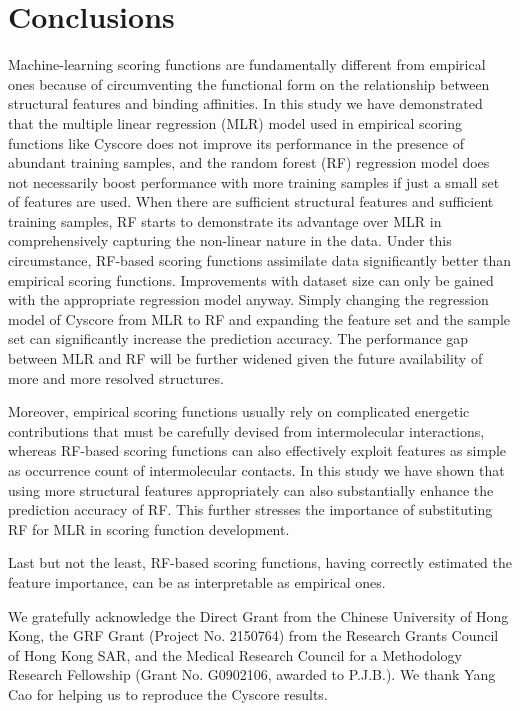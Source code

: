 \documentclass[journal=jacsat,manuscript=article]{achemso}
\begin{document}
\section{Conclusions}

Machine-learning scoring functions are fundamentally different from empirical ones because of circumventing the functional form on the relationship between structural features and binding affinities. In this study we have demonstrated that the multiple linear regression (MLR) model used in empirical scoring functions like Cyscore does not improve its performance in the presence of abundant training samples, and the random forest (RF) regression model does not necessarily boost performance with more training samples if just a small set of features are used. When there are sufficient structural features and sufficient training samples, RF starts to demonstrate its advantage over MLR in comprehensively capturing the non-linear nature in the data. Under this circumstance, RF-based scoring functions assimilate data significantly better than empirical scoring functions. Improvements with dataset size can only be gained with the appropriate regression model anyway. Simply changing the regression model of Cyscore from MLR to RF and expanding the feature set and the sample set can significantly increase the prediction accuracy. The performance gap between MLR and RF will be further widened given the future availability of more and more resolved structures.

Moreover, empirical scoring functions usually rely on complicated energetic contributions that must be carefully devised from intermolecular interactions, whereas RF-based scoring functions can also effectively exploit features as simple as occurrence count of intermolecular contacts. In this study we have shown that using more structural features appropriately can also substantially enhance the prediction accuracy of RF. This further stresses the importance of substituting RF for MLR in scoring function development.

Last but not the least, RF-based scoring functions, having correctly estimated the feature importance, can be as interpretable as empirical ones.

\begin{acknowledgement}

We gratefully acknowledge the Direct Grant from the Chinese University of Hong Kong, the GRF Grant (Project No. 2150764) from the Research Grants Council of Hong Kong SAR, and the Medical Research Council for a Methodology Research Fellowship (Grant No. G0902106, awarded to P.J.B.). We thank Yang Cao for helping us to reproduce the Cyscore results.

\end{acknowledgement}
\end{document}
